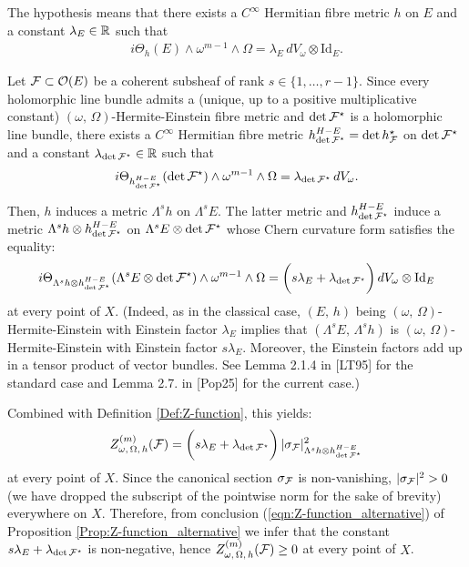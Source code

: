 \documentclass[12pt]{article}
\begin{document}
 The hypothesis means that there exists a $C^\infty$ Hermitian fibre metric $h$ on $E$ and a constant $\lambda_E\in\mathbb{R}$ such that \begin{eqnarray*}i\Theta_h(E)\wedge\omega^{m-1}\wedge\Omega = \lambda_E\,dV_\omega\otimes\mbox{Id}_E.\end{eqnarray*}

Let ${\cal F}\subset{\cal O}(E)$ be a coherent subsheaf  of rank $s\in\{1,\dots , r-1\}$. Since every holomorphic line bundle admits a (unique, up to a positive multiplicative constant) $(\omega,\,\Omega)$-Hermite-Einstein fibre metric and $\det{\cal F}^\star$ is a holomorphic line bundle, there exists a $C^\infty$ Hermitian fibre metric $h^{H-E}_{\det{\cal F}^\star} =\det h_{{\cal F}}^\star$ on $\det{\cal F}^\star$ and a constant $\lambda_{\det{\cal F}^\star}\in\mathbb{R}$ such that \begin{eqnarray*}i\Theta_{h^{H-E}_{\det{\cal F}^\star}}(\det{\cal F}^\star)\wedge\omega^{m-1}\wedge\Omega = \lambda_{\det{\cal F}^\star}\,dV_\omega.\end{eqnarray*}

Then, $h$ induces a metric $\Lambda^sh$ on $\Lambda^sE$. The latter metric and $h^{H-E}_{\det{\cal F}^\star}$ induce a metric $\Lambda^sh\otimes h^{H-E}_{\det{\cal F}^\star}$ on $\Lambda^sE\otimes\det{\cal F}^\star$ whose Chern curvature form satisfies the equality: \begin{eqnarray*}i\Theta_{\Lambda^sh\otimes h^{H-E}_{\det{\cal F}^\star}}(\Lambda^sE\otimes\det{\cal F}^\star)\wedge\omega^{m-1}\wedge\Omega = \bigg(s\lambda_E + \lambda_{\det{\cal F}^\star}\bigg)\,dV_\omega\otimes\mbox{Id}_E\end{eqnarray*} at every point of $X$. (Indeed, as in the classical case, $(E,\,h)$ being $(\omega,\,\Omega)$-Hermite-Einstein with Einstein factor $\lambda_E$ implies that $(\Lambda^sE,\,\Lambda^sh)$ is $(\omega,\,\Omega)$-Hermite-Einstein with Einstein factor $s\lambda_E$. Moreover, the Einstein factors add up in a tensor product of vector bundles. See Lemma 2.1.4 in [LT95] for the standard case and Lemma 2.7. in [Pop25] for the current case.)

  Combined with Definition \ref{Def:Z-function}, this yields: \begin{eqnarray}\label{The:H-E_implies_m-pos-stability_proof_1}Z_{\omega,\,\Omega,\,h}^{(m)}({\cal F}) = \bigg(s\lambda_E + \lambda_{\det{\cal F}^\star}\bigg)\,|\sigma_{{\cal F}}|^2_{\Lambda^sh\otimes h^{H-E}_{\det{\cal F}^\star}}\end{eqnarray} at every point of $X$. Since the canonical section $\sigma_{{\cal F}}$ is non-vanishing, $|\sigma_{{\cal F}}|^2> 0$ (we have dropped the subscript of the pointwise norm for the sake of brevity) everywhere on $X$. Therefore, from conclusion (\ref{eqn:Z-function_alternative}) of Proposition \ref{Prop:Z-function_alternative} we infer that the constant $s\lambda_E + \lambda_{\det{\cal F}^\star}$ is non-negative, hence $Z_{\omega,\,\Omega,\,h}^{(m)}({\cal F})\geq 0$ at every point of $X$.
\end{document}
